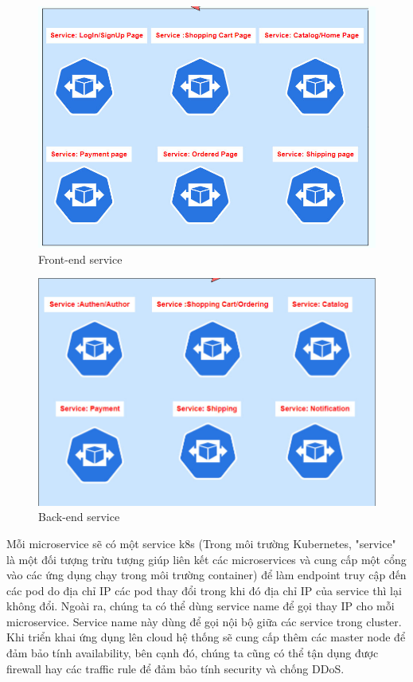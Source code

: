  \begin{figure}[H]
    \begin{center}
    \includegraphics[scale = 0.6]{images/phat/frontend-service.jpg}
    \vspace*{7mm}
    \caption{Front-end service}
    \end{center}
    \label{}
\end{figure}
 \begin{figure}[H]
    \begin{center}
    \includegraphics[scale = 0.6]{images/phat/backend-service.jpg}
    \vspace*{7mm}
    \caption{Back-end service}
    \end{center}
    \label{}
\end{figure}

\noindent Mỗi microservice sẽ có một service k8s (Trong môi trường Kubernetes, "service" là một đối tượng trừu tượng giúp liên kết các microservices và cung cấp một cổng vào các ứng dụng chạy trong môi trường container) để làm endpoint truy cập đến các pod do địa chỉ IP các pod thay đổi trong khi đó địa chỉ IP của service thì lại không đổi. Ngoài ra, chúng ta có thể dùng service name để gọi thay IP cho mỗi microservice. Service name này dùng để gọi nội bộ giữa các service trong cluster. Khi triển khai ứng dụng lên cloud hệ thống sẽ cung cấp thêm các master node để đảm bảo tính availability, bên cạnh đó, chúng ta cũng có thể tận dụng được firewall hay các traffic rule để đảm bảo tính security và chống DDoS.

